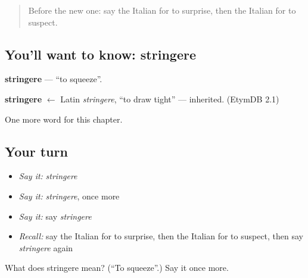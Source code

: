 \label{lesson:IT-C184-stringere}



\begin{quote}
Before the new one: say the Italian for to surprise, then the Italian for to suspect.
\end{quote}

\subsection*{You'll want to know: stringere}
\textbf{stringere} — \textquotedblleft{}to squeeze\textquotedblright{}.

\begin{cousinweb}
\textbf{stringere} $\leftarrow$ Latin \emph{stringere}, \textquotedblleft{}to draw tight\textquotedblright{} — inherited. (EtymDB 2.1)
\end{cousinweb}

\begin{grammarlens}[title={What you've built}]
One more word for this chapter.
\end{grammarlens}

\subsection*{Your turn}
\begin{itemize}
\raggedright
  \item \emph{Say it:} \emph{stringere}
  \item \emph{Say it:} \emph{stringere}, once more
  \item \emph{Say it:} say \emph{stringere}
  \item \emph{Recall:} say the Italian for to surprise, then the Italian for to suspect, then say \emph{stringere} again
\end{itemize}

\begin{tcolorbox}[breakable,colback=teal!4,colframe=teal!35!black,title={Before you move on}]
What does stringere mean? (\textquotedblleft{}To squeeze\textquotedblright{}.) Say it once more.
\end{tcolorbox}
